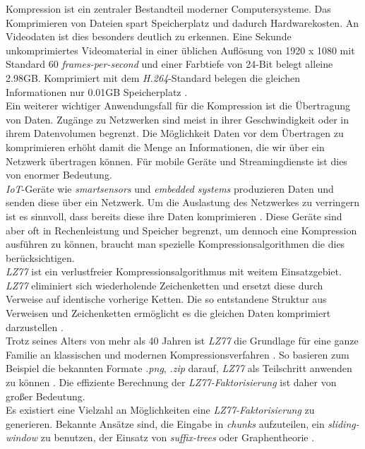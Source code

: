 	Kompression ist ein zentraler Bestandteil  moderner Computersysteme. Das Komprimieren von Dateien spart Speicherplatz und dadurch Hardwarekosten.
	An Videodaten ist dies besonders deutlich zu erkennen. Eine Sekunde unkomprimiertes Videomaterial in einer üblichen Auflösung von 1920 x 1080 mit Standard 60 \textit{frames-per-second} und einer Farbtiefe von 24-Bit belegt alleine 2.98GB.
	Komprimiert mit dem \textit{H.264}-Standard belegen die gleichen Informationen nur 0.01GB Speicherplatz \cite{h.264}.\\
	Ein weiterer wichtiger Anwendungsfall für die Kompression ist die Übertragung von Daten.
	Zugänge zu Netzwerken sind meist in ihrer Geschwindigkeit oder in ihrem Datenvolumen begrenzt. Die Möglichkeit Daten vor dem Übertragen zu komprimieren erhöht damit die Menge an Informationen, die wir über ein Netzwerk übertragen können.
	Für mobile Geräte und Streamingdienste ist dies von enormer Bedeutung. \\
	\textit{IoT}-Geräte wie \textit{smartsensors} und \textit{embedded systems} produzieren Daten und senden diese über ein Netzwerk. Um die Auslastung des Netzwerkes zu verringern ist es sinnvoll, dass bereits diese ihre Daten komprimieren \cite{7149287} \cite{IoT2}. Diese Geräte sind aber oft in Rechenleistung und Speicher begrenzt, um dennoch eine Kompression ausführen zu können, braucht man spezielle Kompressionsalgorithmen die dies berücksichtigen.\\
	{\it LZ77} ist ein verlustfreier Kompressionsalgorithmus mit weitem Einsatzgebiet.
	{\it LZ77} eliminiert sich wiederholende Zeichenketten und ersetzt diese durch Verweise auf identische vorherige Ketten.
	Die so entstandene Struktur aus Verweisen und Zeichenketten ermöglicht es die gleichen Daten komprimiert darzustellen \cite{LZ77}.\\
	Trotz seines Alters von mehr als 40 Jahren ist \textit{LZ77} die Grundlage für eine ganze Familie an klassischen und modernen Kompressionsverfahren \cite{LZSS} \cite{brotli} \cite{geldreich}.
	So basieren zum Beispiel die bekannten Formate \textit{.png},  \textit{.zip} darauf, \textit{LZ77} als Teilschritt anwenden zu können \cite{PNG} \cite{deflate}. Die effiziente Berechnung der {\it LZ77-Faktorisierung} ist daher von großer Bedeutung.\\
	Es existiert  eine Vielzahl an Möglichkeiten eine {\it LZ77-Faktorisierung} zu generieren.
	Bekannte Ansätze sind, die Eingabe in \textit{chunks} aufzuteilen, ein \textit{sliding-window} zu benutzen, der Einsatz von \textit{suffix-trees} oder Graphentheorie \cite{deflate} \cite{LZ77parrallel} \cite{shun} \cite{Nittograph}.
